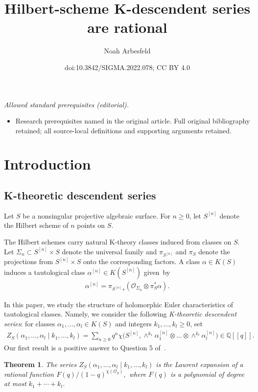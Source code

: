 \documentclass[10pt,a4paper]{amsart}
\title{Hilbert-scheme K-descendent series are rational}
\author{Noah Arbesfeld}
\date{doi:10.3842/SIGMA.2022.078; CC BY 4.0}
\newtheorem{Theorem}{Theorem}[section]
\numberwithin{equation}{section}
\def\Q{\mathbb Q}
\begin{document}
\maketitle
\noindent\textit{Allowed standard prerequisites (editorial).}\begin{itemize}
\item Research prerequisites named in the original article. Full original bibliography retained; all source-local definitions and supporting arguments retained.
\end{itemize}\medskip
\section{Introduction}
\subsection{K-theoretic descendent series}

Let $S$ be a nonsingular projective algebraic surface. For $n\geq 0$, let $S^{[n]}$ denote the Hilbert scheme of $n$ points on $S$.

The Hilbert schemes carry natural K-theory classes induced from classes on $S$. Let $\Sigma_n\subset S^{[n]}\times S$ denote the universal family and $\pi_{S^{[n]}}$ and $\pi_S$ denote the projections from $S^{[n]}\times S$ onto the corresponding factors. A class $\alpha\in K(S)$ induces a tautological class $\alpha^{[n]}\in K(S^{[n]})$ given~by \begin{gather}\label{tautdef}
\alpha^{[n]}={\pi_{S^{[n]}}}_*(\mathcal{O}_{\Sigma_n}\otimes \pi_S^*\alpha ).
\end{gather}

In this paper, we study the structure of holomorphic Euler characteristics of tautological classes. Namely, we consider the following {\em K-theoretic descendent series}: for classes $\alpha_1,\dots,\alpha_l \in K(S)$ and integers $k_1,\dots,k_l\geq 0$, set \begin{align}\label{projseries}
Z_{S}(\alpha_1,\dots,\alpha_l\mid k_1,\dots,k_l)=\sum_{n\geq 0} q^n \chi\big(S^{[n]}, \wedge^{k_1} \alpha^{[n]}_1 \otimes \dots \otimes \wedge^{k_l} \alpha_l^{[n]} \big)\in \Q[[q]].
\end{align}
Our first result is a positive answer to Question 5 of~\cite{AJLOP}.


\begin{Theorem}\label{descrat}
The series $Z_{S}(\alpha_1,\dots,\alpha_l\mid k_1,\dots,k_l)$ is the Laurent expansion of a rational function $F(q)/(1-q)^{\chi(\mathcal{O}_S)},$ where $F(q)$ is a polynomial of degree at most $k_1+\cdots+k_l$.
\end{Theorem}
\end{document}
